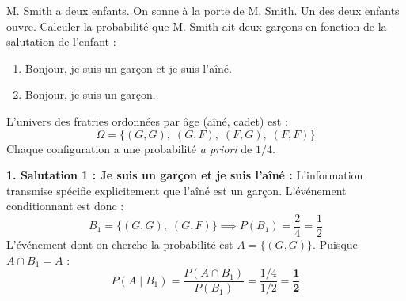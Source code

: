 \documentclass[11pt,a4paper]{article}
\begin{document}
M. Smith a deux enfants. On sonne à la porte de M. Smith. Un des deux enfants ouvre.
Calculer la probabilité que M. Smith ait deux garçons en fonction de la salutation de l'enfant :
\begin{enumerate}[label=\arabic*.]
    \item \og Bonjour, je suis un garçon et je suis l'aîné. \fg{}
    \item \og Bonjour, je suis un garçon. \fg{}
\end{enumerate}

\begin{correctionbox}
L'univers des fratries ordonnées par âge (aîné, cadet) est :
\[
\Omega = \{ (G, G), \; (G, F), \; (F, G), \; (F, F) \}
\]
Chaque configuration a une probabilité \emph{a priori} de $1/4$.

\textbf{1. Salutation 1 : \og Je suis un garçon et je suis l'aîné \fg{} :}
L'information transmise spécifie explicitement que l'aîné est un garçon.
L'événement conditionnant est donc :
\[
B_1 = \{ (G, G), \; (G, F) \} \implies P(B_1) = \frac{2}{4} = \frac{1}{2}
\]
L'événement dont on cherche la probabilité est $A = \{(G, G)\}$. Puisque $A \cap B_1 = A$ :
\[
P(A \mid B_1) = \frac{P(A \cap B_1)}{P(B_1)} = \frac{1/4}{1/2} = \mathbf{\frac{1}{2}}
\]


\end{correctionbox}
\end{document}
